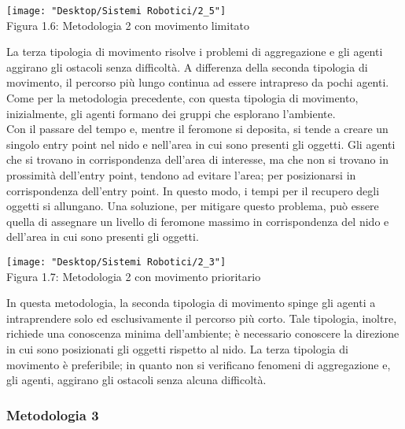 \documentclass[12pt,a4paper,openright,twoside]{report}
\begin{document}
\begin{center}  
	\texttt{[image: "Desktop/Sistemi Robotici/2\_5"]}
	\\Figura 1.6: Metodologia 2 con movimento limitato
\end{center}

La terza tipologia di movimento risolve i problemi di aggregazione e gli agenti aggirano gli ostacoli senza difficoltà. A differenza della seconda tipologia di movimento, il percorso più lungo continua ad essere intrapreso da pochi agenti.\\
Come per la metodologia precedente, con questa tipologia di movimento, inizialmente, gli agenti formano dei gruppi che esplorano l'ambiente.\\
Con il passare del tempo e, mentre il feromone si deposita, si tende a creare un singolo entry point nel nido e nell'area in cui sono presenti gli oggetti. Gli agenti che si trovano in corrispondenza dell'area di interesse, ma che non si trovano in prossimità dell'entry point, tendono ad evitare l'area; per posizionarsi in corrispondenza dell'entry point. In questo modo, i tempi per il recupero degli oggetti si allungano. Una soluzione, per mitigare questo problema, può essere quella di assegnare un livello di feromone massimo in corrispondenza del nido e dell'area in cui sono presenti gli oggetti.\\
 
\begin{center}  
	\texttt{[image: "Desktop/Sistemi Robotici/2\_3"]}
	\\Figura 1.7: Metodologia 2 con movimento prioritario
\end{center} 
  
In questa metodologia, la seconda tipologia di movimento spinge gli agenti a intraprendere solo ed esclusivamente il percorso più corto. Tale tipologia, inoltre, richiede una conoscenza minima dell'ambiente; è necessario conoscere la direzione in cui sono posizionati gli oggetti rispetto al nido. La terza tipologia di movimento è preferibile; in quanto non si verificano fenomeni di aggregazione e, gli agenti, aggirano gli ostacoli senza alcuna difficoltà.\\

\subsubsection{Metodologia 3}
\end{document}
